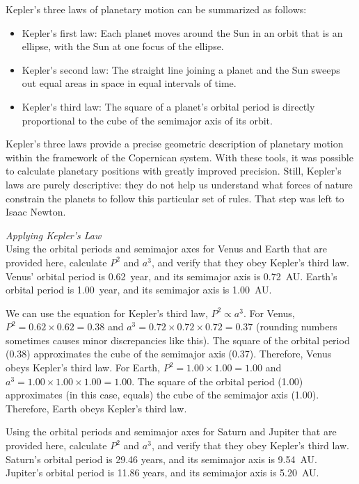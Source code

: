 \documentclass[main-astronomy.tex]{subfiles}
\begin{document}
Kepler's three laws of planetary motion can be summarized as follows:

\begin{itemize}
    \item \gls{Kepler's first law}: Each planet moves around the Sun in an orbit that is an ellipse, with the Sun at one focus of the ellipse.
    \item \gls{Kepler's second law}: The straight line joining a planet and the Sun sweeps out equal areas in space in equal intervals of time.
    \item \gls{Kepler's third law}: The square of a planet's orbital period is directly proportional to the cube of the semimajor axis of its orbit.
\end{itemize}

Kepler's three laws provide a precise geometric description of planetary motion within the framework of the Copernican system. With these tools, it was possible to calculate planetary positions with greatly improved precision. Still, Kepler's laws are purely descriptive: they do not help us understand what forces of nature constrain the planets to follow this particular set of rules. That step was left to Isaac Newton.

\begin{example}
    \textit{Applying Kepler's Law}\\
    Using the orbital periods and semimajor axes for Venus and Earth that are provided here, calculate $P^2$ and $a^3$, and verify that they obey Kepler's third law. Venus' orbital period is \SI{0.62}{year}, and its semimajor axis is \SI{0.72}{AU}. Earth's orbital period is \SI{1.00}{year}, and its semimajor axis is \SI{1.00}{AU}.
\end{example}

\Solution We can use the equation for Kepler’s third law, $P^2 \propto a^3$. For Venus, $P^2= 0.62 \times 0.62 = 0.38$ and $a^3 = 0.72 \times 0.72 \times 0.72 =0.37$ (rounding numbers sometimes causes minor discrepancies like this). The square of the orbital period (0.38) approximates the cube of the semimajor axis (0.37). Therefore, Venus obeys Kepler's third law. For Earth,  $P^2= 1.00 \times 1.00 = 1.00$ and $a^3 = 1.00 \times 1.00 \times 1.00 = 1.00$. The square of the orbital period (1.00) approximates (in this case, equals) the cube of the semimajor axis (1.00). Therefore, Earth obeys Kepler's third law.

\endsolution

\begin{cfu}
    Using the orbital periods and semimajor axes for Saturn and Jupiter that are provided here, calculate $P^2$ and $a^3$, and verify that they obey Kepler's third law. Saturn's orbital period is 29.46 years, and its semimajor axis is \SI{9.54}{AU}. Jupiter's orbital period is 11.86 years, and its semimajor axis is \SI{5.20}{AU}.
\end{cfu}
\end{document}
